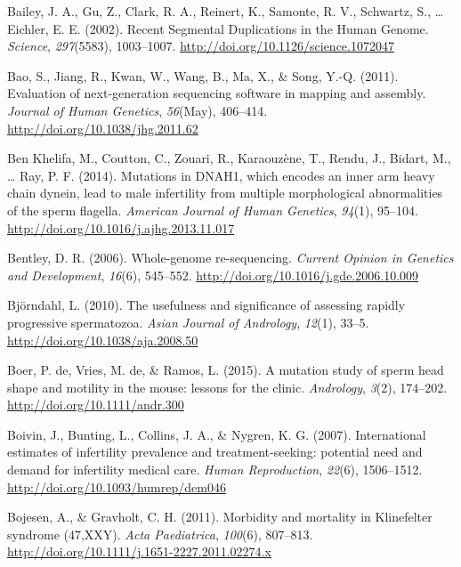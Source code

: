 \documentclass[12pt,twoside]{reedthesis}
\theoremstyle{definition}
\theoremstyle{definition}
\theoremstyle{remark}
\begin{document}
  \hypertarget{ref-Bailey2002}{}
  Bailey, J. A., Gu, Z., Clark, R. A., Reinert, K., Samonte, R. V.,
  Schwartz, S., \ldots{} Eichler, E. E. (2002). Recent Segmental
  Duplications in the Human Genome. \emph{Science}, \emph{297}(5583),
  1003--1007. \url{http://doi.org/10.1126/science.1072047}
  
  \hypertarget{ref-Bao2011}{}
  Bao, S., Jiang, R., Kwan, W., Wang, B., Ma, X., \& Song, Y.-Q. (2011).
  Evaluation of next-generation sequencing software in mapping and
  assembly. \emph{Journal of Human Genetics}, \emph{56}(May), 406--414.
  \url{http://doi.org/10.1038/jhg.2011.62}
  
  \hypertarget{ref-BenKhelifa2014}{}
  Ben Khelifa, M., Coutton, C., Zouari, R., Karaouzène, T., Rendu, J.,
  Bidart, M., \ldots{} Ray, P. F. (2014). Mutations in DNAH1, which
  encodes an inner arm heavy chain dynein, lead to male infertility from
  multiple morphological abnormalities of the sperm flagella.
  \emph{American Journal of Human Genetics}, \emph{94}(1), 95--104.
  \url{http://doi.org/10.1016/j.ajhg.2013.11.017}
  
  \hypertarget{ref-Bentley2006}{}
  Bentley, D. R. (2006). Whole-genome re-sequencing. \emph{Current Opinion
  in Genetics and Development}, \emph{16}(6), 545--552.
  \url{http://doi.org/10.1016/j.gde.2006.10.009}
  
  \hypertarget{ref-Bjorndahl2010}{}
  Björndahl, L. (2010). The usefulness and significance of assessing
  rapidly progressive spermatozoa. \emph{Asian Journal of Andrology},
  \emph{12}(1), 33--5. \url{http://doi.org/10.1038/aja.2008.50}
  
  \hypertarget{ref-DeBoer2015}{}
  Boer, P. de, Vries, M. de, \& Ramos, L. (2015). A mutation study of
  sperm head shape and motility in the mouse: lessons for the clinic.
  \emph{Andrology}, \emph{3}(2), 174--202.
  \url{http://doi.org/10.1111/andr.300}
  
  \hypertarget{ref-Boivin2007a}{}
  Boivin, J., Bunting, L., Collins, J. A., \& Nygren, K. G. (2007).
  International estimates of infertility prevalence and treatment-seeking:
  potential need and demand for infertility medical care. \emph{Human
  Reproduction}, \emph{22}(6), 1506--1512.
  \url{http://doi.org/10.1093/humrep/dem046}
  
  \hypertarget{ref-Bojesen2011}{}
  Bojesen, A., \& Gravholt, C. H. (2011). Morbidity and mortality in
  Klinefelter syndrome (47,XXY). \emph{Acta Paediatrica}, \emph{100}(6),
  807--813. \url{http://doi.org/10.1111/j.1651-2227.2011.02274.x}
  
\end{document}

